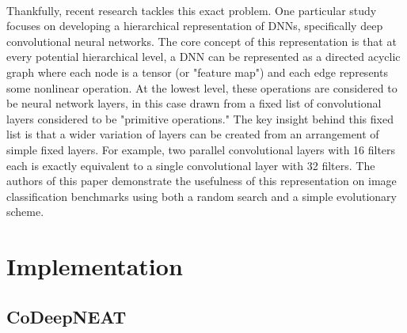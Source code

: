 \documentclass[11pt]{article}
\begin{document}
    \\Thankfully, recent research \cite{hierarchical} tackles this exact problem. One particular study focuses on developing a hierarchical representation of DNNs, specifically deep convolutional neural networks. The core concept of this representation is that at every potential hierarchical level, a DNN can be represented as a directed acyclic graph where each node is a tensor (or "feature map") and each edge represents some nonlinear operation. At the lowest level, these operations are considered to be neural network layers, in this case drawn from a fixed list of convolutional layers considered to be "primitive operations." The key insight behind this fixed list is that a wider variation of layers can be created from an arrangement of simple fixed layers. For example, two parallel convolutional layers with 16 filters each is exactly equivalent to a single convolutional layer with 32 filters. The authors of this paper demonstrate the usefulness of this representation on image classification benchmarks using both a random search and a simple evolutionary scheme.\\

\section{Implementation}
\subsection{CoDeepNEAT}
\end{document}

